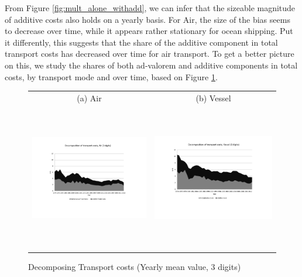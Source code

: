 \documentclass[a4paper,11pt]{article}
\begin{document}
From Figure \ref{fig:mult_alone_withadd}, we can infer that the sizeable magnitude of additive costs also holds on a yearly basis. For Air, the size of the bias seems to decrease over time, while it appears rather stationary for ocean shipping. Put it differently, this suggests that the share of the additive component in total transport costs has decreased over time for air transport. To get a better picture on this, we study the shares of both ad-valorem and additive components in total costs, by transport mode and over time, based on Figure \ref{fig:decomp_TC_3d}.

\begin{figure}[htbp]
\caption{Decomposing Transport costs (Yearly mean value, 3 digits)}
\label{fig:decomp_TC_3d}
\begin{center}
\begin{tabular}{cc}
{\small (a) Air } & {\small (b) Vessel}\\
\includegraphics[width=3in, height=2.5in]{Fig2a_decompTC_air_3d.pdf}
& \includegraphics[width=3in,height=2.5in]{Fig2b_decompTC_vessel_3d.pdf} \\
\end{tabular}
\end{center}
\end{figure}
\end{document}
